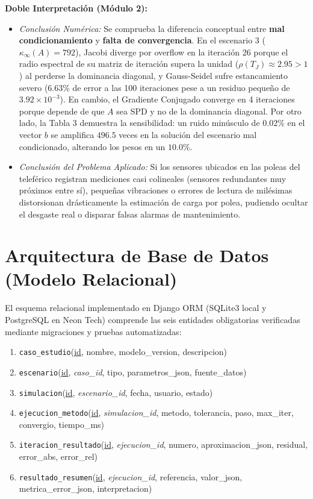 \documentclass[a4paper,12pt]{article}
\begin{document}
\textbf{Doble Interpretación (Módulo 2):}
\begin{itemize}
    \item \textit{Conclusión Numérica:} Se comprueba la diferencia conceptual entre \textbf{mal condicionamiento} y \textbf{falta de convergencia}. En el escenario 3 ($\kappa_\infty(A)=792$), Jacobi diverge por overflow en la iteración 26 porque el radio espectral de su matriz de iteración supera la unidad ($\rho(T_J) \approx 2.95 > 1$) al perderse la dominancia diagonal, y Gauss-Seidel sufre estancamiento severo ($6.63\%$ de error a las 100 iteraciones pese a un residuo pequeño de $3.92\times 10^{-3}$). En cambio, el Gradiente Conjugado converge en 4 iteraciones porque depende de que $A$ sea SPD y no de la dominancia diagonal. Por otro lado, la Tabla 3 demuestra la sensibilidad: un ruido minúsculo de $0.02\%$ en el vector $b$ se amplifica $496.5$ veces en la solución del escenario mal condicionado, alterando los pesos en un $10.0\%$.
    \item \textit{Conclusión del Problema Aplicado:} Si los sensores ubicados en las poleas del teleférico registran mediciones casi colineales (sensores redundantes muy próximos entre sí), pequeñas vibraciones o errores de lectura de milésimas distorsionan drásticamente la estimación de carga por polea, pudiendo ocultar el desgaste real o disparar falsas alarmas de mantenimiento.
\end{itemize}

\section{Arquitectura de Base de Datos (Modelo Relacional)}

El esquema relacional implementado en Django ORM (SQLite3 local y PostgreSQL en Neon Tech) comprende las seis entidades obligatorias verificadas mediante migraciones y pruebas automatizadas:
\begin{enumerate}
    \item \texttt{caso\_estudio}(\underline{id}, nombre, modelo\_version, descripcion)
    \item \texttt{escenario}(\underline{id}, \textit{caso\_id}, tipo, parametros\_json, fuente\_datos)
    \item \texttt{simulacion}(\underline{id}, \textit{escenario\_id}, fecha, usuario, estado)
    \item \texttt{ejecucion\_metodo}(\underline{id}, \textit{simulacion\_id}, metodo, tolerancia, paso, max\_iter, convergio, tiempo\_ms)
    \item \texttt{iteracion\_resultado}(\underline{id}, \textit{ejecucion\_id}, numero, aproximacion\_json, residual, error\_abs, error\_rel)
    \item \texttt{resultado\_resumen}(\underline{id}, \textit{ejecucion\_id}, referencia, valor\_json, metrica\_error\_json, interpretacion)
\end{enumerate}
\end{document}
